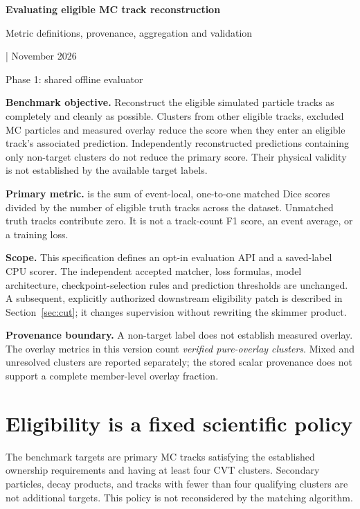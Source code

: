 \documentclass[11pt,letterpaper]{article}
\newcommand{\metric}[1]{\texttt{\small\detokenize{#1}}}
\newcommand{\code}[1]{\texttt{\detokenize{#1}}}
\begin{document}
\begin{center}
{\LARGE\bfseries Evaluating eligible MC track reconstruction}\par
\vspace{6pt}
{\large Metric definitions, provenance, aggregation and validation}\par
\vspace{5pt}
\code{mc_reconstruction_v1}\quad | November 2026\par
Phase 1: shared offline evaluator
\end{center}

\textbf{Benchmark objective.} Reconstruct the eligible simulated particle tracks
as completely and cleanly as possible. Clusters from other eligible tracks,
excluded MC particles and measured overlay reduce the score when they enter an
eligible track's associated prediction. Independently reconstructed predictions
containing only non-target clusters do not reduce the primary score. Their
physical validity is not established by the available target labels.

\textbf{Primary metric.} \metric{mc_track_dice_mean} is the sum of event-local,
one-to-one matched Dice scores divided by the number of eligible truth tracks
across the dataset. Unmatched truth tracks contribute zero. It is not a
track-count F1 score, an event average, or a training loss.

\textbf{Scope.} This specification defines an opt-in evaluation API and a saved-label
CPU scorer. The independent accepted matcher, loss formulas, model architecture,
checkpoint-selection rules and prediction thresholds are unchanged. A subsequent,
explicitly authorized downstream eligibility patch is described in Section~\ref{sec:cut};
it changes supervision without rewriting the skimmer product.

\textbf{Provenance boundary.} A non-target label does not establish measured
overlay. The overlay metrics in this version count \emph{verified pure-overlay
clusters}. Mixed and unresolved clusters are reported separately; the stored
scalar provenance does not support a complete member-level overlay fraction.

\tableofcontents
\newpage

\section{Eligibility is a fixed scientific policy}

The benchmark targets are primary MC tracks satisfying the established ownership
requirements and having at least four CVT clusters. Secondary particles, decay
products, and tracks with fewer than four qualifying clusters are not additional
targets. This policy is not reconsidered by the matching algorithm.
\end{document}
